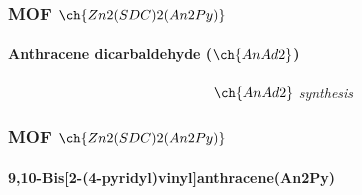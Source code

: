 \documentclass[aspectratio=169,fleqn,table]{beamer}
\begin{document}
\begin{frame}
        \frametitle{MOF $\ch{Zn2(SDC)2(An2Py)}$}
        \framesubtitle{Anthracene dicarbaldehyde ($\ch{AnAd2}$)}

        \begin{figure}\centering
                \begin{minipage}[b]{0.46\textwidth}
                        \centering
                        \vspace{-10pt}
                        \vspace{-5pt}
                        \caption{%
                                \textit{\ \ \ \ \  System to $\ch{AnAd2}$ synthesis}}
                \end{minipage}
                \hfill
                \begin{minipage}[b]{0.46\textwidth}
                        \centering
                        \vspace{-10pt}
                        \vspace{-5pt}
                        \caption{%
                                \textit{\ \ \ \ \ \ \ \ \ \ \ \ \ \ \ \ \ \ \ \ \ \ \ $\ch{AnAd2}$ synthesis}}
                \end{minipage}
        \end{figure}

\end{frame}


\begin{frame}
\frametitle{MOF $\ch{Zn2(SDC)2(An2Py)}$}
\framesubtitle{9,10-Bis[2-(4-pyridyl)vinyl]anthracene(An2Py)}

\vspace{-35pt}
\begin{figure}[border=1pt]
\end{figure}

\end{frame}


\end{document}
